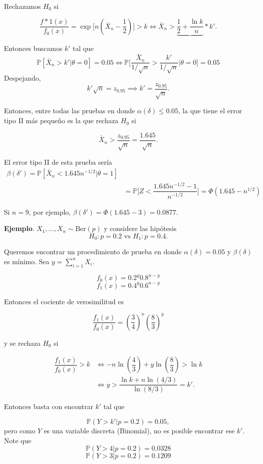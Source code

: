 \documentclass[
  12pt,
]{book}
\begin{document}
Rechazamos \(H_0\) si

\[\dfrac{f*1(x)}{f_0(x)} = \exp\bigg[n\left(\bar X_n - \dfrac 12\right)\bigg]>k \Leftrightarrow \bar X_n > \underbrace{\dfrac 12 + \dfrac{\ln k}{n}}*{k'} .\]

Entonces buscamos \(k'\) tal que
\[\mathbb P[\bar X_n>k'|\theta = 0]=0.05 \Leftrightarrow\mathbb P\bigg[\dfrac{\bar X_n}{1/\sqrt n}>\dfrac{k'}{1/\sqrt n}\bigg|\theta = 0\bigg]=0.05\]
Despejando,
\[k'\sqrt n= z_{0.95} \implies k'=\dfrac{z_{0.95}}{\sqrt n}.\]

Entonces, entre todas las pruebas en donde \(\alpha(\delta)\leq 0.05\), la que
tiene el error tipo II más pequeño es la que rechaza \(H_0\) si

\[\bar X_n > \dfrac{z_{0.95}}{\sqrt n} = \dfrac{1.645}{\sqrt n}.\]

El error tipo II de esta prueba sería
\begin{align*}
\beta(\delta') = \mathbb P[\bar X_n<1.645n^{-1/2}|\theta = 1]\\
& = \mathbb P\bigg[Z < \dfrac{1.645n^{-1/2}-1}{n^{-1/2}}\bigg] = \Phi(1.645-n^{1/2})
\end{align*}

Si \(n=9\), por ejemplo, \(\beta(\delta') = \Phi(1.645-3) =0.0877.\)

\textbf{Ejemplo}. \(X_1,\dots,X_n\sim\text{Ber}(p)\) y considere las hipótesis
\[H_0: p = 0.2 \text{ vs } H_1: p = 0.4.\]

Queremos encontrar un procedimiento de prueba en donde \(\alpha(\delta) = 0.05\) y
\(\beta(\delta)\) es mínimo. Sea \(y = \sum_{i=1}^{n} X_i\).

\[f_0(x) = 0.2^y0.8^{n-y}\]
\[f_1(x) = 0.4^y0.6^{n-y}\]

Entonces el cociente de verosimilitud es

\[\dfrac{f_1(x)}{f_0(x)}=\left(\dfrac 34\right)^n\left(\dfrac 83\right)^y\]

y se rechaza \(H_0\) si

\begin{align*}
\dfrac{f_1(x)}{f_0(x)}>k & \Leftrightarrow -n\ln \left(\dfrac 43 \right) + y \ln \left(\dfrac 83 \right)>\ln k\\ & \Leftrightarrow y>\dfrac{\ln k + n\ln(4/3)}{\ln (8/3)} = k'.
\end{align*}

Entonces basta con encontrar \(k'\) tal que

\[\mathbb P(Y>k'|p = 0.2) = 0.05,\]
pero como \(Y\) es una variable discreta (Binomial), no es posible encontrar ese \(k'\). Note que
\[\mathbb P(Y>4|p=0.2) = 0.0328\]
\[\mathbb P(Y>3|p=0.2) = 0.1209\]
\end{document}
